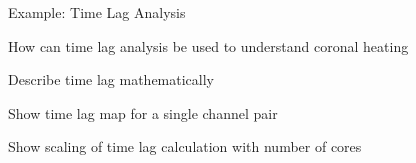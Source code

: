 \begin{block}{Example: Time Lag Analysis}

How can time lag analysis be used to understand coronal heating \citet{viall_evidence_2012}

Describe time lag mathematically \citet{barnes_understanding_2019}

Show time lag map for a single channel pair

Show scaling of time lag calculation with number of cores

\end{block}